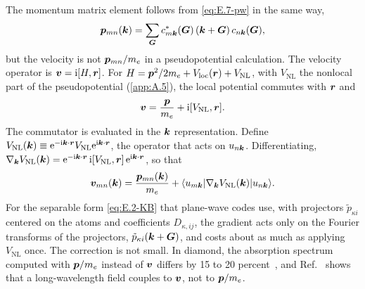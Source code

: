 The momentum matrix element follows from \cref{eq:E.7-pw} in the same way,
\begin{equation}
  \bm{p}_{mn}(\bm{k}) = \sum_{\bm{G}} c^*_{m\bm{k}}(\bm{G})\,(\bm{k} + \bm{G})\,c_{n\bm{k}}(\bm{G}) ,
  \label{eq:E.7-ppw}
\end{equation}
but the velocity is not $\bm{p}_{mn}/m_e$ in a pseudopotential calculation. The velocity operator is $\bm{v} = \mathrm{i}[H,\bm{r}]$. For $H = \bm{p}^2/2m_e + V_{\mathrm{loc}}(\bm{r}) + V_{\mathrm{NL}}$, with $V_{\mathrm{NL}}$ the nonlocal part of the pseudopotential (\cref{app:A.5}), the local potential commutes with $\bm{r}$ and
\begin{equation}
  \bm{v} = \frac{\bm{p}}{m_e} + \mathrm{i}[V_{\mathrm{NL}},\bm{r}] .
  \label{eq:E.7-v}
\end{equation}
The commutator is evaluated in the $\bm{k}$ representation. Define $V_{\mathrm{NL}}(\bm{k}) \equiv \mathrm{e}^{-\mathrm{i}\bm{k}\cdot\bm{r}}V_{\mathrm{NL}}\mathrm{e}^{\mathrm{i}\bm{k}\cdot\bm{r}}$, the operator that acts on $u_{n\bm{k}}$. Differentiating, $\nabla_{\bm{k}}V_{\mathrm{NL}}(\bm{k}) = \mathrm{e}^{-\mathrm{i}\bm{k}\cdot\bm{r}}\,\mathrm{i}[V_{\mathrm{NL}},\bm{r}]\,\mathrm{e}^{\mathrm{i}\bm{k}\cdot\bm{r}}$, so that
\begin{equation}
  \bm{v}_{mn}(\bm{k}) = \frac{\bm{p}_{mn}(\bm{k})}{m_e} + \langle u_{m\bm{k}}|\nabla_{\bm{k}}V_{\mathrm{NL}}(\bm{k})|u_{n\bm{k}}\rangle .
  \label{eq:E.7-vNL}
\end{equation}
For the separable form \cref{eq:E.2-KB} that plane-wave codes use, with projectors $\tilde p_{\kappa i}$ centered on the atoms and coefficients $D_{\kappa,ij}$, the gradient acts only on the Fourier transforms of the projectors, $\tilde p_{\kappa i}(\bm{k}+\bm{G})$, and costs about as much as applying $V_{\mathrm{NL}}$ once. The correction is not small. In diamond, the absorption spectrum computed with $\bm{p}/m_e$ instead of $\bm{v}$ differs by 15 to 20 percent~\cite[Fig.~1]{ismailbeigi2001coupling}, and Ref.~\cite[Eq.~(20)]{ismailbeigi2001coupling} shows that a long-wavelength field couples to $\bm{v}$, not to $\bm{p}/m_e$.

